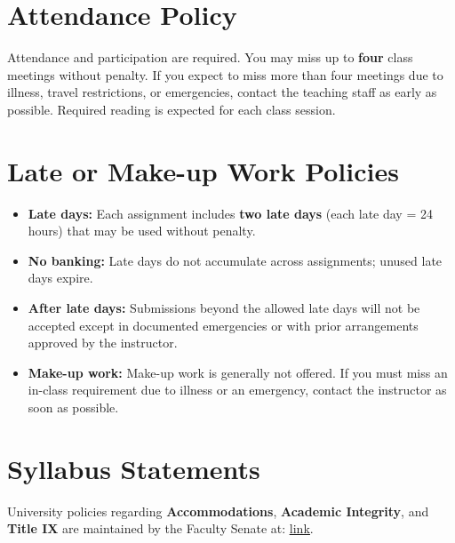 \documentclass[11pt]{article}
\newcommand{\link}[2]{\href{#1}{\uline{#2}}}
\begin{document}
\section*{Attendance Policy}
Attendance and participation are required. You may miss up to \textbf{four} class meetings without penalty. If you expect to miss more than four meetings due to illness, travel restrictions, or emergencies, contact the teaching staff as early as possible. Required reading is expected for each class session.

\section*{Late or Make-up Work Policies}
\begin{itemize}
  \item \textbf{Late days:} Each assignment includes \textbf{two late days} (each late day = 24 hours) that may be used without penalty.
  \item \textbf{No banking:} Late days do not accumulate across assignments; unused late days expire.
  \item \textbf{After late days:} Submissions beyond the allowed late days will not be accepted except in documented emergencies or with prior arrangements approved by the instructor.
  \item \textbf{Make-up work:} Make-up work is generally not offered. If you must miss an in-class requirement due to illness or an emergency, contact the instructor as soon as possible.
\end{itemize}

\section*{Syllabus Statements}
University policies regarding \textbf{Accommodations}, \textbf{Academic Integrity}, and \textbf{Title IX} are maintained by the Faculty Senate at: \link{https://www.umass.edu/senate/book/non-responsible-employee-required-syllabus-statements}{link}.
\end{document}
